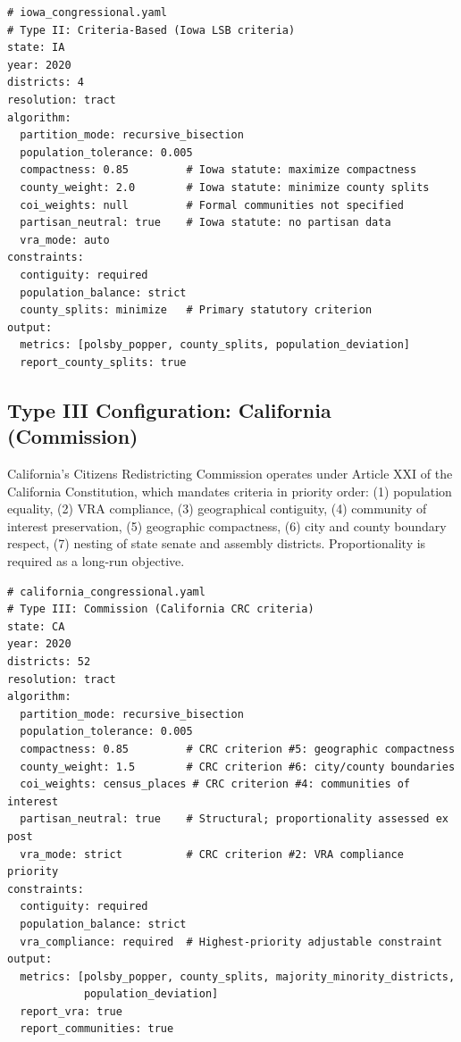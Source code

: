 \begin{verbatim}
# iowa_congressional.yaml
# Type II: Criteria-Based (Iowa LSB criteria)
state: IA
year: 2020
districts: 4
resolution: tract
algorithm:
  partition_mode: recursive_bisection
  population_tolerance: 0.005
  compactness: 0.85         # Iowa statute: maximize compactness
  county_weight: 2.0        # Iowa statute: minimize county splits
  coi_weights: null         # Formal communities not specified
  partisan_neutral: true    # Iowa statute: no partisan data
  vra_mode: auto
constraints:
  contiguity: required
  population_balance: strict
  county_splits: minimize   # Primary statutory criterion
output:
  metrics: [polsby_popper, county_splits, population_deviation]
  report_county_splits: true
\end{verbatim}

\subsection{Type III Configuration: California (Commission)}

California's Citizens Redistricting Commission operates under Article XXI of the California Constitution, which mandates criteria in priority order: (1) population equality, (2) VRA compliance, (3) geographical contiguity, (4) community of interest preservation, (5) geographic compactness, (6) city and county boundary respect, (7) nesting of state senate and assembly districts. Proportionality is required as a long-run objective.

\begin{verbatim}
# california_congressional.yaml
# Type III: Commission (California CRC criteria)
state: CA
year: 2020
districts: 52
resolution: tract
algorithm:
  partition_mode: recursive_bisection
  population_tolerance: 0.005
  compactness: 0.85         # CRC criterion #5: geographic compactness
  county_weight: 1.5        # CRC criterion #6: city/county boundaries
  coi_weights: census_places # CRC criterion #4: communities of interest
  partisan_neutral: true    # Structural; proportionality assessed ex post
  vra_mode: strict          # CRC criterion #2: VRA compliance priority
constraints:
  contiguity: required
  population_balance: strict
  vra_compliance: required  # Highest-priority adjustable constraint
output:
  metrics: [polsby_popper, county_splits, majority_minority_districts,
            population_deviation]
  report_vra: true
  report_communities: true
\end{verbatim}

